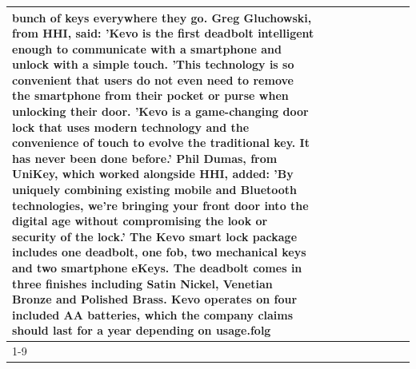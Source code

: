 \begin{table}[H]
\begin{tabular}{lllrlllll}
bunch of keys everywhere they go. Greg Gluchowski, from HHI, said: 'Kevo is the first deadbolt intelligent enough to communicate with a smartphone and unlock with a simple touch. 'This technology is so convenient that users do not even need to remove the smartphone from their pocket or purse when unlocking their door. 'Kevo is a game-changing door lock that uses modern technology and the convenience of touch to evolve the traditional key. It has never been done before.' Phil Dumas, from UniKey, which worked alongside HHI, added: 'By uniquely combining existing mobile and Bluetooth technologies, we’re bringing your front door into the digital age without compromising the look or security of the lock.' The Kevo smart lock package includes one deadbolt, one fob, two mechanical keys and two smartphone eKeys. The deadbolt comes in three finishes including Satin Nickel, Venetian Bronze and Polished Brass. Kevo operates on four included AA batteries, which the company claims should last for a year depending on usage.folg \\
\cline{1-9}

\end{tabular}
\end{table}
